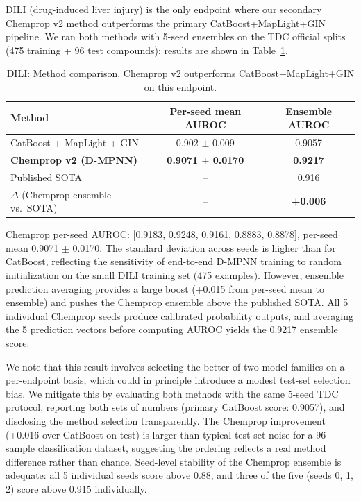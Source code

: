 \documentclass[11pt]{article}
\begin{document}
DILI (drug-induced liver injury) is the only endpoint where our secondary Chemprop v2 method outperforms the primary CatBoost+MapLight+GIN pipeline. We ran both methods with 5-seed ensembles on the TDC official splits (475 training + 96 test compounds); results are shown in Table~\ref{tab:dili}.

\begin{table}[h]
\centering
\caption{DILI: Method comparison. Chemprop v2 outperforms CatBoost+MapLight+GIN on this endpoint.}
\label{tab:dili}
\begin{tabular}{lcc}
\toprule
Method & Per-seed mean AUROC & Ensemble AUROC \\
\midrule
CatBoost + MapLight + GIN & 0.902 $\pm$ 0.009 & 0.9057 \\
\textbf{Chemprop v2 (D-MPNN)} & \textbf{0.9071 $\pm$ 0.0170} & \textbf{0.9217} \\
\midrule
Published SOTA & -- & 0.916 \\
$\Delta$ (Chemprop ensemble vs.\ SOTA) & -- & \textbf{+0.006} \\
\bottomrule
\end{tabular}
\end{table}

Chemprop per-seed AUROC: [0.9183, 0.9248, 0.9161, 0.8883, 0.8878], per-seed mean 0.9071 $\pm$ 0.0170. The standard deviation across seeds is higher than for CatBoost, reflecting the sensitivity of end-to-end D-MPNN training to random initialization on the small DILI training set (475 examples). However, ensemble prediction averaging provides a large boost (+0.015 from per-seed mean to ensemble) and pushes the Chemprop ensemble above the published SOTA. All 5 individual Chemprop seeds produce calibrated probability outputs, and averaging the 5 prediction vectors before computing AUROC yields the 0.9217 ensemble score.

We note that this result involves selecting the better of two model families on a per-endpoint basis, which could in principle introduce a modest test-set selection bias. We mitigate this by evaluating both methods with the same 5-seed TDC protocol, reporting both sets of numbers (primary CatBoost score: 0.9057), and disclosing the method selection transparently. The Chemprop improvement (+0.016 over CatBoost on test) is larger than typical test-set noise for a 96-sample classification dataset, suggesting the ordering reflects a real method difference rather than chance. Seed-level stability of the Chemprop ensemble is adequate: all 5 individual seeds score above 0.88, and three of the five (seeds 0, 1, 2) score above 0.915 individually.
\end{document}
